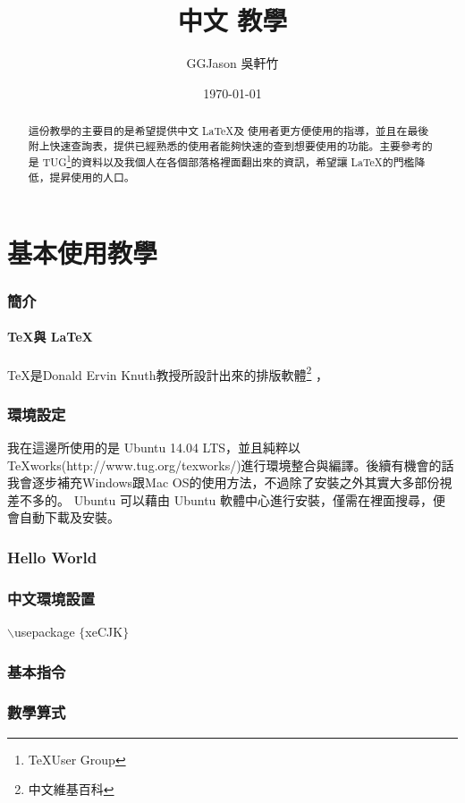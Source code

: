 \documentclass[12pt,a4paper]{article}
\title{中文 \XeLaTeX 教學}
\author{GGJason 吳軒竹}
\date{\today}
\begin{document}
	\maketitle
	\newpage
	\begin{abstract}
		這份教學的主要目的是希望提供中文 \LaTeX 及 \XeLaTeX 使用者更方便使用的指導，並且在最後附上快速查詢表，提供已經熟悉的使用者能夠快速的查到想要使用的功能。主要參考的是 TUG\footnote{\TeX  User Group}的資料以及我個人在各個部落格裡面翻出來的資訊，希望讓 \LaTeX 的門檻降低，提昇使用的人口。
	\end{abstract}
	\newpage
	\tableofcontents
	\newpage
	\part{ \XeLaTeX 基本使用教學}

		\section{ \XeLaTeX 簡介}
			\subsection{\TeX 與 \LaTeX}
				\TeX 是Donald Ervin Knuth教授所設計出來的排版軟體\footnote{中文維基百科} ，
			\subsection{\XeLaTeX}
		\section{ \XeLaTeX 環境設定}
			我在這邊所使用的是 Ubuntu 14.04 LTS，並且純粹以TeXworks(http://www.tug.org/texworks/)進行環境整合與編譯。後續有機會的話我會逐步補充Windows跟Mac OS的使用方法，不過除了安裝之外其實大多部份視差不多的。	
			Ubuntu 可以藉由 Ubuntu 軟體中心進行安裝，僅需在裡面搜尋，便會自動下載及安裝。
		\section{ Hello World }

		\section{中文環境設置}
		$\backslash$usepackage $\{$xeCJK$\}$
		\section{基本指令}

		\section{數學算式}
\end{document}
